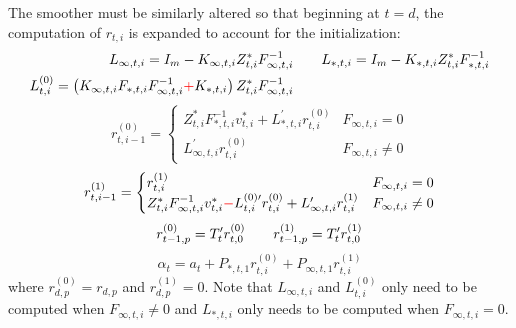 \documentclass[12pt]{article}
\newcommand{\flag}[0]{red}
\begin{document}
	The smoother must be similarly altered so that beginning at $t = d$, the computation of $r_{t,i}$ is expanded to account for the initialization:
	\begin{align*}
	L_{\infty,t,i} = I_m - K_{\infty,t,i} Z_{t,i}^* F_{\infty,t,i}^{-1} &\qquad
	L_{*,t,i} = I_m - K_{*,t,i} Z_{t,i}^* F_{*,t,i}^{-1} \\
	L_{t,i}^{(0)} = \left(K_{\infty,t,i} F_{*,t,i} F_{\infty,t,i}^{-1} {\color{\flag} +} K_{*,t,i} \right) Z_{t,i}^* F_{\infty,t,i}^{-1} &
	\end{align*}
	\begin{equation*}
	r_{t,i-1}^{(0)} = \begin{cases} 
	   Z_{t,i}^* F_{*,t,i}^{-1} v_{t,i}^* + L_{*,t,i}^\prime r_{t,i}^{(0)} & F_{\infty,t,i} = 0 \\
	   L_{\infty,t,i}^\prime r_{t,i}^{(0)} & F_{\infty,t,i} \neq 0	   
	\end{cases} 
	\end{equation*}
	\begin{equation*}
	r_{t,i-1}^{(1)} = \begin{cases} 
	   r_{t,i}^{(1)} & F_{\infty,t,i} = 0 \\
	   Z_{t,i}^* F_{\infty,t,i}^{-1} v_{t,i}^* {\color{\flag} -} L_{t,i}^{(0)\prime} r_{t,i}^{(0)} + L_{\infty,t,i}^\prime r_{t,i}^{(1)} & F_{\infty,t,i} \neq 0	   
	\end{cases} 
	\end{equation*}
	\begin{equation*}
	r_{t-1,p}^{(0)} = T_t^\prime r_{t,0}^{(0)} \qquad r_{t-1,p}^{(1)} = T_t^\prime r_{t,0}^{(1)}  \\
	\end{equation*}
	\begin{equation*}
	\hat{\alpha}_t = a_t + P_{*,t,1} r_{t,i}^{(0)} + P_{\infty,t,1} r_{t,i}^{(1)}
	\end{equation*}
	where $r_{d,p}^{(0)} = r_{d,p}$ and $r_{d,p}^{(1)} = 0$. Note that $L_{\infty,t,i}$ and $L_{t,i}^{(0)}$ only need to be computed when $F_{\infty,t,i} \neq 0$ and $L_{*,t,i}$ only needs to be computed when $F_{\infty,t,i} = 0$. \\
\end{document}
